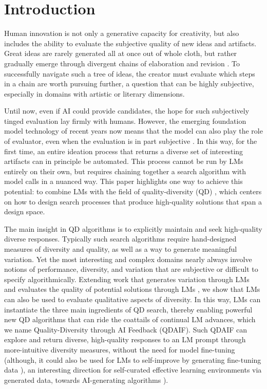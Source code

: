 \section{Introduction}
Human innovation is not only a generative capacity for creativity, but also includes the ability to evaluate the subjective quality of new ideas and artifacts. Great ideas are rarely generated all at once out of whole cloth, but rather gradually emerge through divergent chains of elaboration and revision \citep{stanley2015greatness}. To successfully navigate such a tree of ideas, the creator must evaluate which steps in a chain are worth pursuing further, a question that can be highly subjective, especially in domains with artistic or literary dimensions.

Until now, even if AI could provide candidates, the hope for such subjectively tinged evaluation lay firmly with humans. However, the emerging foundation model technology of recent years \citep{bommasani2021opportunities} now means that the model can also play the role of evaluator, even when the evaluation is in part subjective \citep{madaan2023self}. In this way, for the first time, an entire ideation process that returns a diverse set of interesting artifacts can in principle be automated. This process cannot be run by LMs entirely on their own, but requires chaining together a search algorithm with model calls in a nuanced way. This paper highlights one way to achieve this potential: to combine LMs with the field of quality-diversity (QD) \citep{mouret2015illuminating}, which centers on how to design search processes that produce high-quality solutions that span a design space.

The main insight in QD algorithms is to explicitly maintain and seek high-quality diverse responses. Typically such search algorithms require hand-designed measures of diversity and quality, as well as a way to generate meaningful variation. Yet the most interesting and complex domains nearly always involve notions of performance, diversity, and variation that are subjective or difficult to specify algorithmically. Extending work that generates variation through LMs \citep{lehman2022evolution, meyerson2023language} and evaluates the quality of potential solutions through LMs \citep{ahn2022can}, we show that LMs can also be used to evaluate qualitative aspects of diversity. In this way, LMs can instantiate the three main ingredients of QD search, thereby enabling powerful new QD algorithms that can ride the coattails of continual LM advances, which we name Quality-Diversity through AI Feedback (QDAIF). Such QDAIF can explore and return diverse, high-quality responses to an LM prompt through more-intuitive diversity measures, without the need for model fine-tuning (although, it could also be used for LMs to self-improve by generating fine-tuning data \citep{lehman2022evolution, chen2023evoprompting}), an interesting direction for self-curated effective learning environments via generated data, towards AI-generating algorithms \citep{clune2019ai}).

